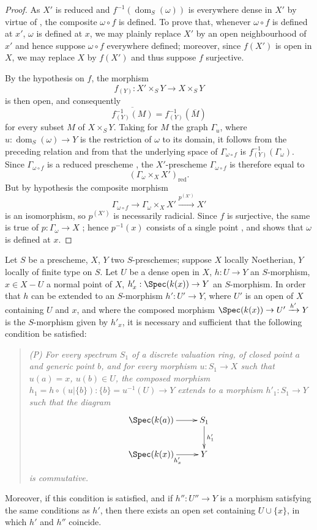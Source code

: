 \begin{proof}
As $X'$ is reduced and $f^{-1}(\operatorname{dom}_S(\omega))$ is everywhere dense in $X'$ by virtue of , the composite $\omega\circ f$ is defined.
To prove that, whenever $\omega\circ f$ is defined at $x'$, $\omega$ is defined at $x$, we may plainly replace $X'$ by an open neighbourhood of $x'$ and hence suppose $\omega\circ f$ everywhere defined;
moreover, since $f(X')$ is open in $X$, we may replace $X$ by $f(X')$ and thus suppose $f$ surjective.

By the hypothesis on $f$, the morphism
\[
  f_{(Y)}:X'\times_S Y\longrightarrow X\times_S Y
\]
is then open, and consequently
\[
  \overline{f_{(Y)}^{-1}(M)}=f_{(Y)}^{-1}(\overline{M})
\]
for every subset $M$ of $X\times_S Y$.
Taking for $M$ the graph $\Gamma_u$, where $u:\operatorname{dom}_S(\omega)\to Y$ is the restriction of $\omega$ to its domain, it follows from the preceding relation and from  that the underlying space of $\Gamma_{\omega\circ f}$ is $f_{(Y)}^{-1}(\Gamma_\omega)$.
Since
$\Gamma_{\omega\circ f}$ is a reduced prescheme , the $X'$-prescheme $\Gamma_{\omega\circ f}$ is therefore equal to
\[
  (\Gamma_\omega\times_X X')_{\mathrm{red}}.
\]
But by hypothesis the composite morphism
\[
  \Gamma_{\omega\circ f}\longrightarrow\Gamma_\omega\times_X X'
  \xrightarrow{p^{(X')}}X'
\]
is an isomorphism, so $p^{(X')}$ is necessarily radicial.
Since $f$ is surjective, the same is true of $p:\Gamma_\omega\to X$ ; hence $p^{-1}(x)$ consists of a single point , and  shows that $\omega$ is defined at $x$.
\end{proof}

\begin{proposition}[20.4.6]
\label{IV.20.4.6}
Let $S$ be a prescheme, $X$, $Y$ two $S$-preschemes;
suppose $X$ locally Noetherian, $Y$ locally of finite type on $S$.
Let $U$ be a dense open in $X$, $h:U\to Y$ an $S$-morphism, $x\in X-U$ a normal point of $X$, $h'_x:\Spec(k(x))\to Y$ an $S$-morphism.
In order that $h$ can be extended to an $S$-morphism $h':U'\to Y$, where $U'$ is an open of $X$ containing $U$ and $x$, and where the composed morphism $\Spec(k(x))\to U'\xrightarrow{h'}Y$ is the $S$-morphism given by $h'_x$, it is necessary and sufficient that the following condition be satisfied:
\begin{quote}
\emph{(P) For every spectrum $S_1$ of a discrete valuation ring, of closed point $a$ and generic point $b$, and for every morphism $u:S_1\to X$ such that $u(a)=x$, $u(b)\in U$, the composed morphism $h_1=h\circ(u|\{b\}):\{b\}=u^{-1}(U)\to Y$ extends to a morphism $h'_1:S_1\to Y$ such that the diagram}
\[
  \xymatrix{
  \Spec(k(a)) \ar[r] & S_1 \ar[d]^{h'_1} \\
  \Spec(k(x)) \ar[r]_{h'_x} & Y
  }
\]
\emph{is commutative.}
\end{quote}
Moreover, if this condition is satisfied, and if $h'':U''\to Y$ is a morphism satisfying the same conditions as $h'$, then there exists an open set containing $U\cup\{x\}$, in which $h'$ and $h''$ coincide.
\end{proposition}

